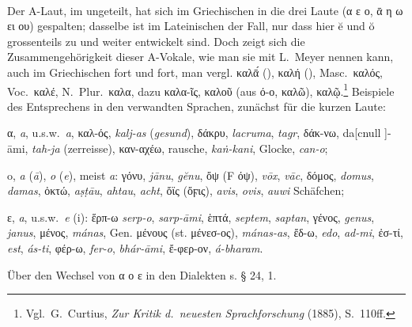 \paragraph{} Der A-Laut, im  ungeteilt, hat sich im Griechischen in die
drei Laute    (α ε ο, ᾱ η ω ει ου) gespalten; dasselbe ist im Lateinischen
der Fall, nur dass hier ĕ und ŏ grossenteils zu  und  weiter entwickelt sind.
Doch zeigt sich die Zusammengehörigkeit dieser A-Vokale, wie man sie mit
L.~Meyer nennen kann, auch im Griechischen fort und fort, man vergl. καλᾱ́
(),
καλή (), Masc.\ καλός, Voc.\ καλέ, N.\ Plur.\ καλα, dazu
καλα-ῖς, καλοῦ (aus ό-ο,  καλῶ), καλῷ.\footnote{
Vgl.\ G.\ Curtius, \emph{Zur Kritik d.\ neuesten Sprachforschung} (1885), S.\ 110ff.}
Beispiele des Entsprechens in den verwandten
Sprachen, zunächst für die kurzen Laute:
\begin{compactenum}[(a)]
  \item {} α,  \emph{a},
     u.s.w.\ \emph{a}, καλ-ός, 
    \emph{kalj-as} (\emph{gesund}), δάκρυ,  \emph{lacruma},
     \emph{tagr}, δάκ-νω,  da[cnull
    ]-āmi,  \emph{tah-ja} (zerreisse), καν-αχέω, rausche,
     \emph{kaṅ-kani}, Glocke, 
    \emph{can-o};  
\item {} o,  \emph{a} (\emph{ā}),
   \emph{o} (\emph{e}),  meist \emph{a}: γόνυ,
   \emph{jānu},  \emph{gĕnu}, ὄψ (F
  όψ),  \emph{vōx},  \emph{vāc}, δόμος,
   \emph{domus},  \emph{damas}, ὀκτώ,
   \emph{aṣṭāu},  \emph{ahtau},
   \emph{acht}, ὄϊς (ὄϝις),  \emph{avis},
   \emph{ovis},  \emph{auwi}
  Schäfchen;
\item {} ε,  \emph{a}, 
  u.s.w.\ \emph{e} (i): ἕρπ-ω  \emph{serp-o},
   \emph{sarp-āmi}, ἑπτά, 
  \emph{septem},  \emph{saptan}, γένος,
   \emph{genus},  \emph{janus}, μένος,
   \emph{mánas}, Gen. μένους (st. μένεσ-ος),
   \emph{mánas-as}, ἔδ-ω,  \emph{edo},
   \emph{ad-mi}, ἐσ-τί,  \emph{est},
   \emph{ás-ti}, φέρ-ω,  \emph{fer-o},
   \emph{bhár-āmi}, ἔ-φερ-ον, 
  \emph{á-bharam}. 
\end{compactenum} 
Über den Wechsel von α ο ε in den Dialekten s. § 24, 1.

